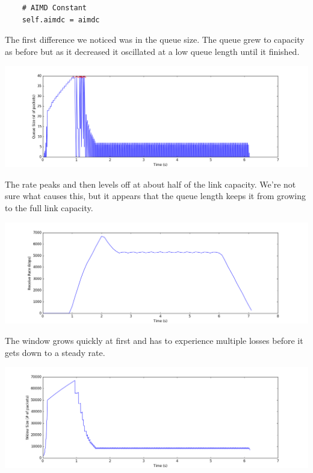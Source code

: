 \documentclass[11pt]{article}
\begin{document}
\vspace{5mm}

\begin{lstlisting}
    # AIMD Constant
    self.aimdc = aimdc
\end{lstlisting}

\vspace{5mm}

The first difference we noticed was in the queue size. The queue grew to capacity as before but as it decreased it oscillated at a low queue length until it finished.

\vspace{5mm}

\includegraphics[width=17cm]{charts/advanced/aimd/queueSize.png}

\vspace{5mm}

The rate peaks and then levels off at about half of the link capacity. We're not sure what causes this, but it appears that the queue length keeps it from growing to the full link capacity.

\vspace{5mm}

\includegraphics[width=17cm]{charts/advanced/aimd/rateTime1.png}

\vspace{5mm}

The window grows quickly at first and has to experience multiple losses before it gets down to a steady rate.

\vspace{5mm}

\includegraphics[width=17cm]{charts/advanced/aimd/windowSize1.png}
\end{document}
